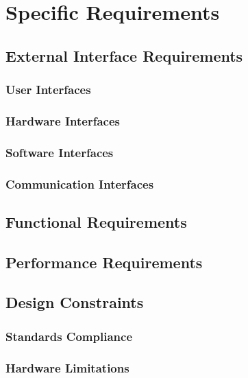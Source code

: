 \documentclass[a4paper]{article}
\begin{document}
\section{Specific Requirements}

\subsection{External Interface Requirements}

\subsubsection{User Interfaces}

\subsubsection{Hardware Interfaces}

\subsubsection{Software Interfaces}

\subsubsection{Communication Interfaces}

\subsection{Functional Requirements}

\subsection{Performance Requirements}

\subsection{Design Constraints}

\subsubsection{Standards Compliance}

\subsubsection{Hardware Limitations}
\end{document}
